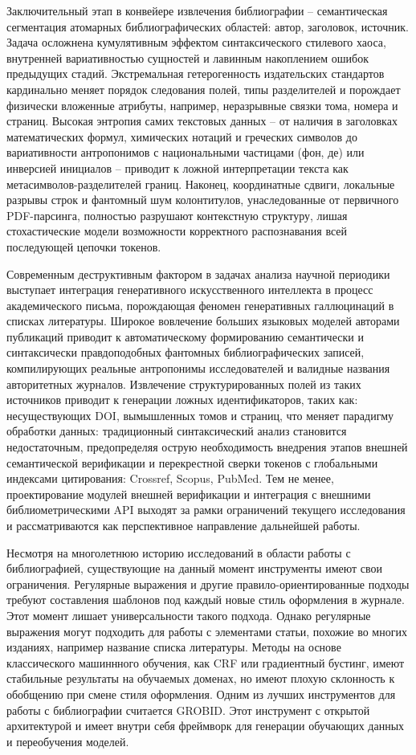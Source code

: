 Заключительный этап в конвейере извлечения библиографии -- семантическая сегментация атомарных библиографических областей: автор, заголовок, источник. Задача осложнена кумулятивным эффектом синтаксического \guillemotleft стилевого хаоса\guillemotright{}, внутренней вариативностью сущностей и лавинным накоплением ошибок предыдущих стадий. Экстремальная гетерогенность издательских стандартов кардинально меняет порядок следования полей, типы разделителей и порождает физически вложенные атрибуты, например, неразрывные связки тома, номера и страниц. Высокая энтропия самих текстовых данных -- от наличия в заголовках математических формул, химических нотаций и греческих символов до вариативности антропонимов с национальными частицами (\guillemotleft фон\guillemotright, \guillemotleft де\guillemotright) или инверсией инициалов -- приводит к ложной интерпретации текста как метасимволов-разделителей границ. Наконец, координатные сдвиги, локальные разрывы строк и фантомный шум колонтитулов, унаследованные от первичного PDF-парсинга, полностью разрушают контекстную структуру, лишая стохастические модели возможности корректного распознавания всей последующей цепочки токенов.

Современным деструктивным фактором в задачах анализа научной периодики выступает интеграция генеративного искусственного интеллекта в процесс академического письма, порождающая феномен \guillemotleft генеративных галлюцинаций\guillemotright{} в списках литературы. Широкое вовлечение больших языковых моделей авторами публикаций приводит к автоматическому формированию семантически и синтаксически правдоподобных фантомных библиографических записей, компилирующих реальные антропонимы исследователей и валидные названия авторитетных журналов. Извлечение структурированных полей из таких источников приводит к генерации ложных идентификаторов, таких как: несуществующих DOI, вымышленных томов и страниц, что меняет парадигму обработки данных: традиционный синтаксический анализ становится недостаточным, предопределяя острую необходимость внедрения этапов внешней семантической верификации и перекрестной сверки токенов с глобальными индексами цитирования: Crossref, Scopus, PubMed. Тем не менее, проектирование модулей внешней верификации и интеграция с внешними библиометрическими API выходят за рамки ограничений текущего исследования и рассматриваются как перспективное направление дальнейшей работы.

Несмотря на многолетнюю историю исследований в области работы с библиографией, существующие на данный момент инструменты имеют свои ограничения. Регулярные выражения и другие правило-ориентированные подходы требуют составления шаблонов под каждый новые стиль оформления в журнале. Этот момент лишает универсальности такого подхода. Однако регулярные выражения могут подходить для работы с элементами статьи, похожие во многих изданиях, например название списка литературы. Методы на основе классического машиннного обучения, как CRF или градиентный бустинг, имеют стабильные результаты на обучаемых доменах, но имеют плохую склонность к обобщению при смене стиля оформления. Одним из лучших инструментов для работы с библиографии считается GROBID. Этот инструмент с открытой архитектурой и имеет внутри себя фреймворк для генерации обучающих данных и переобучения моделей.

